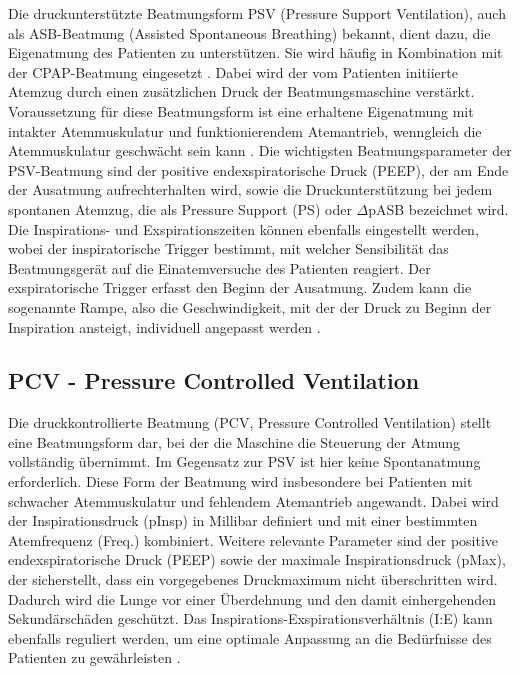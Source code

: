 \documentclass[a4paper,12pt]{article}
\begin{document}
Die druckunterstützte Beatmungsform PSV (Pressure Support Ventilation), auch als
ASB-Beatmung (Assisted Spontaneous Breathing) bekannt, dient dazu, die
Eigenatmung des Patienten zu unterstützen. Sie wird häufig in Kombination mit
der CPAP-Beatmung eingesetzt \cite{PSVASBDruckunterstuetzte}.
Dabei wird der vom Patienten initiierte Atemzug
durch einen zusätzlichen Druck der Beatmungsmaschine verstärkt.
Voraussetzung für diese Beatmungsform ist eine erhaltene Eigenatmung mit
intakter Atemmuskulatur und funktionierendem Atemantrieb, wenngleich die
Atemmuskulatur geschwächt sein kann \cite{PSVBeatmungDruckunterstuetzteBeatmung}.
Die wichtigsten Beatmungsparameter der PSV-Beatmung sind der positive
endexspiratorische Druck (PEEP), der am Ende der Ausatmung aufrechterhalten
wird, sowie die Druckunterstützung bei jedem spontanen Atemzug, die als
Pressure Support (PS) oder $\Delta$pASB bezeichnet wird. Die Inspirations- und
Exspirationszeiten können ebenfalls eingestellt werden, wobei der inspiratorische
Trigger bestimmt, mit welcher Sensibilität das Beatmungsgerät auf die Einatemversuche
des Patienten reagiert. Der exspiratorische Trigger erfasst den Beginn der Ausatmung.
Zudem kann die sogenannte Rampe, also die Geschwindigkeit, mit der der Druck zu Beginn
der Inspiration ansteigt, individuell angepasst werden \cite{PSVASBDruckunterstuetzte}.

\subsection{PCV - Pressure Controlled Ventilation}

Die druckkontrollierte Beatmung (PCV, Pressure Controlled Ventilation) stellt
eine Beatmungsform dar, bei der die Maschine die Steuerung der Atmung vollständig
übernimmt. Im Gegensatz zur PSV ist hier keine Spontanatmung erforderlich.
Diese Form der Beatmung wird insbesondere bei Patienten mit schwacher
Atemmuskulatur und fehlendem Atemantrieb angewandt. Dabei wird der
Inspirationsdruck (pInsp) in Millibar definiert und mit einer bestimmten
Atemfrequenz (Freq.) kombiniert.
Weitere relevante Parameter sind der positive endexspiratorische Druck (PEEP)
sowie der maximale Inspirationsdruck (pMax), der sicherstellt, dass ein
vorgegebenes Druckmaximum nicht überschritten wird. Dadurch wird die Lunge
vor einer Überdehnung und den damit einhergehenden Sekundärschäden geschützt.
Das Inspirations-Exspirationsverhältnis (I:E) kann ebenfalls reguliert werden,
um eine optimale Anpassung an die Bedürfnisse des Patienten zu gewährleisten \cite{doccheckDruckkontrollierteBeatmung}.
\end{document}
